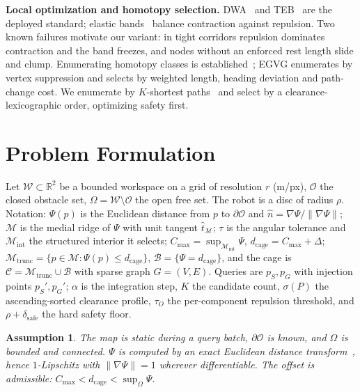 \documentclass[conference]{IEEEtran}
\newtheorem{assumption}{Assumption}
\begin{document}
\textbf{Local optimization and homotopy selection.} DWA~\cite{fox1997} and TEB~\cite{rosmann2012} are the deployed standard; elastic bands~\cite{quinlan1993} balance contraction against repulsion. Two known failures motivate our variant: in tight corridors repulsion dominates contraction and the band freezes, and nodes without an enforced rest length slide and clump. Enumerating homotopy classes is established~\cite{bhattacharya2012,qi2025egvg}; EGVG enumerates by vertex suppression and selects by weighted length, heading deviation and path-change cost. We enumerate by $K$-shortest paths~\cite{yen1971} and select by a clearance-lexicographic order, optimizing safety first.

\section{Problem Formulation}
\label{sec:problem}

Let $\mathcal{W}\subset\mathbb{R}^2$ be a bounded workspace on a grid of resolution $r$ (m/px), $\mathcal{O}$ the closed obstacle set, $\Omega=\mathcal{W}\setminus\mathcal{O}$ the open free set. The robot is a disc of radius $\rho$. Notation: $\Psi(p)$ is the Euclidean distance from $p$ to $\partial\mathcal{O}$ and $\hat{n}=\nabla\Psi/\|\nabla\Psi\|$; $\mathcal{M}$ is the medial ridge of $\Psi$ with unit tangent $\hat{t}_{\mathcal{M}}$; $\tau$ is the angular tolerance and $\mathcal{M}_{\mathrm{int}}$ the structured interior it selects; $C_{\max}=\sup_{\mathcal{M}_{\mathrm{int}}}\Psi$, $d_{\mathrm{cage}}=C_{\max}+\Delta$; $\mathcal{M}_{\mathrm{trunc}}=\{p\in\mathcal{M}:\Psi(p)\le d_{\mathrm{cage}}\}$, $\mathcal{B}=\{\Psi=d_{\mathrm{cage}}\}$, and the cage is $\mathcal{C}=\mathcal{M}_{\mathrm{trunc}}\cup\mathcal{B}$ with sparse graph $G=(V,E)$. Queries are $p_S,p_G$ with injection points $p_S',p_G'$; $\alpha$ is the integration step, $K$ the candidate count, $\sigma(P)$ the ascending-sorted clearance profile, $\tau_O$ the per-component repulsion threshold, and $\rho+\delta_{\mathrm{safe}}$ the hard safety floor.

\begin{assumption}
\label{asm:setting}
The map is static during a query batch, $\partial\mathcal{O}$ is known, and $\Omega$ is bounded and connected. $\Psi$ is computed by an exact Euclidean distance transform~\cite{felzenszwalb2012}, hence $1$-Lipschitz with $\|\nabla\Psi\|=1$ wherever differentiable. The offset is admissible: $C_{\max}<d_{\mathrm{cage}}<\sup_{\Omega}\Psi$.
\end{assumption}
\end{document}
